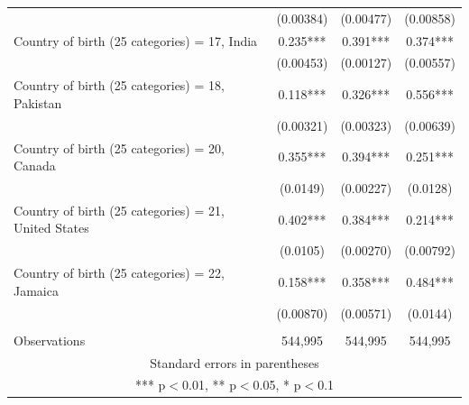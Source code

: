 {\begin{tabular}{lccc}
 & (0.00384) & (0.00477) & (0.00858) \\
Country of birth (25 categories) = 17, India & 0.235*** & 0.391*** & 0.374*** \\
 & (0.00453) & (0.00127) & (0.00557) \\
Country of birth (25 categories) = 18, Pakistan & 0.118*** & 0.326*** & 0.556*** \\
 & (0.00321) & (0.00323) & (0.00639) \\
Country of birth (25 categories) = 20, Canada & 0.355*** & 0.394*** & 0.251*** \\
 & (0.0149) & (0.00227) & (0.0128) \\
Country of birth (25 categories) = 21, United States & 0.402*** & 0.384*** & 0.214*** \\
 & (0.0105) & (0.00270) & (0.00792) \\
Country of birth (25 categories) = 22, Jamaica & 0.158*** & 0.358*** & 0.484*** \\
 & (0.00870) & (0.00571) & (0.0144) \\
 &  &  &  \\
 Observations & 544,995 & 544,995 & 544,995 \\ \hline
\multicolumn{4}{c}{ Standard errors in parentheses} \\
\multicolumn{4}{c}{ *** p$<$0.01, ** p$<$0.05, * p$<$0.1} \\
\end{tabular}}


